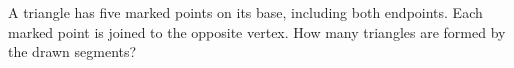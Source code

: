 A triangle has five marked points on its base, including both endpoints. Each marked point is joined to the opposite vertex. How many triangles are formed by the drawn segments?
